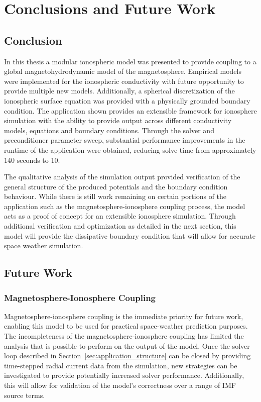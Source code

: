 \chapter{Conclusions and Future Work}
\section{Conclusion}
In this thesis a modular ionospheric model was presented to provide coupling to a global magnetohydrodynamic model of the magnetosphere. Empirical models were implemented for the ionospheric conductivity with future opportunity to provide multiple new models. Additionally, a spherical discretization of the ionospheric surface equation was provided with a physically grounded boundary condition. The application shown provides an extensible framework for ionosphere simulation with the ability to provide output across different conductivity models, equations and boundary conditions. Through the solver and preconditioner parameter sweep, substantial performance improvements in the runtime of the application were obtained, reducing solve time from approximately 140 seconds to 10.

The qualitative analysis of the simulation output provided verification of the general structure of the produced potentials and the boundary condition behaviour. While there is still work remaining on certain portions of the application such as the magnetosphere-ionosphere coupling process, the model acts as a proof of concept for an extensible ionosphere simulation. Through additional verification and optimization as detailed in the next section, this model will provide the dissipative boundary condition that will allow for accurate space weather simulation.
\section{Future Work}
\subsection{Magnetosphere-Ionosphere Coupling}
Magnetosphere-ionosphere coupling is the immediate priority for future work, enabling this model to be used for practical space-weather prediction purposes. The incompleteness of the magnetosphere-ionosphere coupling has limited the analysis that is possible to perform on the output of the model. Once the solver loop described in Section~\ref{sec:application_structure} can be closed by providing time-stepped radial current data from the simulation, new strategies can be investigated to provide potentially increased solver performance. Additionally, this will allow for validation of the model's correctness over a range of IMF source terms.
